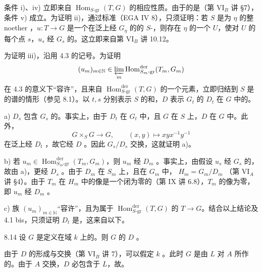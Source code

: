 条件 i)、iv) 立即来自 $\operatorname{Hom}_{S\text{-}\mathrm{gr}}(T,G)$ 的相应性质。由于的是（第 VI$_B$ 讲 \S7），条件 v) 成立。为证明 ii)，通过标准（EGA IV 8），只须证明：若 $S$ 是为 $\eta$ 的整 noether ，$u:T\to G$ 是一个在泛上经 $G_\eta$ 的的 $S$-，则存在 $\eta$ 的一个 $U$，使对 $U$ 的每个点 $s$，$u_s$ 经 $G_s$ 的。这立即来自第 VI$_B$ 讲 10.12。

为证明 iii)，沿用 4.3 的记号。为证明
\[(u_m)_{m\in\mathbb N}\in\varprojlim_m\operatorname{Hom}^{\mathrm{der}}_{S_m\text{-}\mathrm{gr}}(T_m,G_m)\]
在 4.3 的意义下“容许”，且来自 $\operatorname{Hom}^{\mathrm{der}}_{S\text{-}\mathrm{gr}}(T,G)$ 的一个元素，立即归结到 $S$ 是的谱的情形（参见 8.1）。以 $t,s$ 分别表示 $S$ 的和，$D$ 表示 $G_t$ 的 $D_t$ 在 $G$ 中的。

a) $D_s$ 包含 $G_s$ 的。事实上，由于 $D_t$ 在 $G_t$ 中，且 $G$ 在 $S$ 上，$D$ 在 $G$ 中。此外，
\[G\times_S G\longrightarrow G,\qquad(x,y)\longmapsto xyx^{-1}y^{-1}\]
在泛上经 $D_t$ ，故它经 $D$ 。因此 $G_s/D_s$ 交换，这就证明 a)。

b) 若 $u_m\in\operatorname{Hom}^{\mathrm{der}}_{S_m\text{-}\mathrm{gr}}(T_m,G_m)$，则 $u_m$ 经 $D_m$ 。事实上，由假设 $u_s$ 经 $G_s$ 的，故由 a)，更经 $D_s$ 。由于 $D_m$ 在 $S_m$ 上，且在 $G_m$ 中， $H_m=G_m/D_m$ （第 VI$_A$ 讲 \S4）。由于 $T_m$ 在 $H_m$ 中的像是一个闭为零的（第 IX 讲 6.8），$T_m$ 的像为零，即 $u_m$ 经 $D_m$ 。

c) 族 $(u_m)_{m\in\mathbb N}$“容许”，且为属于 $\operatorname{Hom}^{\mathrm{der}}_{S\text{-}\mathrm{gr}}(T,G)$ 的 $T\to G$。结合以上结论及 4.1 bis，只须证明 $D_t$ 是，这来自以下。
\begin{SGAresult}{}{8.14}
设 $G$ 是定义在域 $k$ 上的。则 $G$ 的 $D$ 。
\end{SGAresult}
由于 $D$ 的形成与交换（第 VI$_B$ 讲 7），可以假定 $k$ 。此时 $G$ 是由 $L$ 对 $A$ 所作的。由于 $A$ 交换，$D$ 必包含于 $L$，故。

